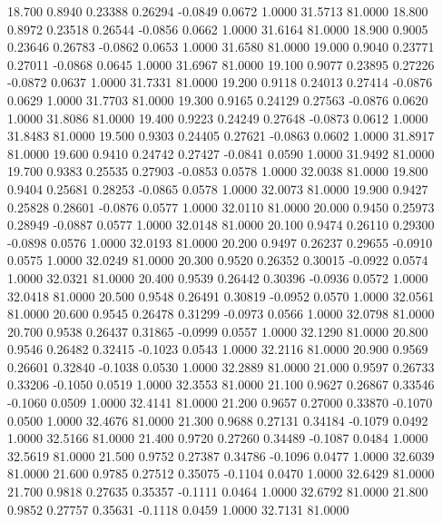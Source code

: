   18.700   0.8940   0.23388   0.26294  -0.0849   0.0672   1.0000  31.5713  81.0000
  18.800   0.8972   0.23518   0.26544  -0.0856   0.0662   1.0000  31.6164  81.0000
  18.900   0.9005   0.23646   0.26783  -0.0862   0.0653   1.0000  31.6580  81.0000
  19.000   0.9040   0.23771   0.27011  -0.0868   0.0645   1.0000  31.6967  81.0000
  19.100   0.9077   0.23895   0.27226  -0.0872   0.0637   1.0000  31.7331  81.0000
  19.200   0.9118   0.24013   0.27414  -0.0876   0.0629   1.0000  31.7703  81.0000
  19.300   0.9165   0.24129   0.27563  -0.0876   0.0620   1.0000  31.8086  81.0000
  19.400   0.9223   0.24249   0.27648  -0.0873   0.0612   1.0000  31.8483  81.0000
  19.500   0.9303   0.24405   0.27621  -0.0863   0.0602   1.0000  31.8917  81.0000
  19.600   0.9410   0.24742   0.27427  -0.0841   0.0590   1.0000  31.9492  81.0000
  19.700   0.9383   0.25535   0.27903  -0.0853   0.0578   1.0000  32.0038  81.0000
  19.800   0.9404   0.25681   0.28253  -0.0865   0.0578   1.0000  32.0073  81.0000
  19.900   0.9427   0.25828   0.28601  -0.0876   0.0577   1.0000  32.0110  81.0000
  20.000   0.9450   0.25973   0.28949  -0.0887   0.0577   1.0000  32.0148  81.0000
  20.100   0.9474   0.26110   0.29300  -0.0898   0.0576   1.0000  32.0193  81.0000
  20.200   0.9497   0.26237   0.29655  -0.0910   0.0575   1.0000  32.0249  81.0000
  20.300   0.9520   0.26352   0.30015  -0.0922   0.0574   1.0000  32.0321  81.0000
  20.400   0.9539   0.26442   0.30396  -0.0936   0.0572   1.0000  32.0418  81.0000
  20.500   0.9548   0.26491   0.30819  -0.0952   0.0570   1.0000  32.0561  81.0000
  20.600   0.9545   0.26478   0.31299  -0.0973   0.0566   1.0000  32.0798  81.0000
  20.700   0.9538   0.26437   0.31865  -0.0999   0.0557   1.0000  32.1290  81.0000
  20.800   0.9546   0.26482   0.32415  -0.1023   0.0543   1.0000  32.2116  81.0000
  20.900   0.9569   0.26601   0.32840  -0.1038   0.0530   1.0000  32.2889  81.0000
  21.000   0.9597   0.26733   0.33206  -0.1050   0.0519   1.0000  32.3553  81.0000
  21.100   0.9627   0.26867   0.33546  -0.1060   0.0509   1.0000  32.4141  81.0000
  21.200   0.9657   0.27000   0.33870  -0.1070   0.0500   1.0000  32.4676  81.0000
  21.300   0.9688   0.27131   0.34184  -0.1079   0.0492   1.0000  32.5166  81.0000
  21.400   0.9720   0.27260   0.34489  -0.1087   0.0484   1.0000  32.5619  81.0000
  21.500   0.9752   0.27387   0.34786  -0.1096   0.0477   1.0000  32.6039  81.0000
  21.600   0.9785   0.27512   0.35075  -0.1104   0.0470   1.0000  32.6429  81.0000
  21.700   0.9818   0.27635   0.35357  -0.1111   0.0464   1.0000  32.6792  81.0000
  21.800   0.9852   0.27757   0.35631  -0.1118   0.0459   1.0000  32.7131  81.0000
